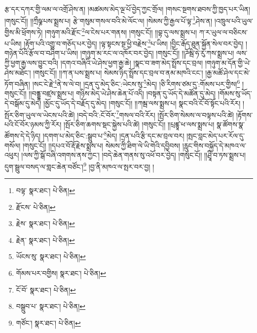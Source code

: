རྩ་དར་དཀར་གྱི་ལམ་ལ་འགྲོ་ཤེས་ན། །མཚམས་མེད་ལྔ་པོ་བྱེད་ཀྱང་གྲོལ། །གསང་སྔགས་ཐབས་ཀྱི་ཁྱད་པར་ཡིན། །གསུང་ངོ།། །།ཀྲྀཥྞ་པས་སྨྲས་པ། རྩེ་གསུམ་གསལ་བའི་མེ་ལོང་ལ། །སེམས་ཀྱི་རྒྱལ་པོ་ལྟ་\footnote{བལྟ་  སྣར་ཐང་།  པེ་ཅིན། }ཤེས་ན། །འཁྲུལ་པའི་ཡུལ་གྱིས་མི་ཕྲོགས་ཏེ། །གཉུག་མའི་རྫོང་\footnote{རྫོངས་  པེ་ཅིན། }ལ་ངེས་པར་གནས། །གསུང་ངོ།། །།བྷ་དུ་ལས་སྨྲས་པ། ཀ་ར་ཡུལ་ལ་བཅིངས་པ་ཡིས། །རྟོག་པའི་འགྱུ་བ་གཅོད་པར་བྱེད། །ལྟ་སྟངས་སྔ་ཕྱི་བརྗེས་\footnote{རྗེས་  སྣར་ཐང་།  པེ་ཅིན། }པ་ཡིས། །བྱིང་རྒོད་ཐུན་སྐྱོན་སེལ་བར་བྱེད། །གཉེན་པོའི་རྩོལ་བ་བཤིག་པ་ཡིས། །གཉུག་མ་རང་ལ་འཁོར་བར་བྱེད། །གསུང་ངོ།། །།ཌོམྦི་ཧེ་རུ་ཀས་སྨྲས་པ། ལས་ཀྱི་ཕྱག་རྒྱ་ལས་བྱུང་བའི། །དགའ་བཞིའི་ཡེ་ཤེས་ཕྱག་རྒྱ་ཆེ། །སྣང་བ་ཟག་མེད་སྤྲོས་དང་བྲལ། །གཉུག་མ་དོན་གྱི་ཡེ་ཤེས་མཐོང་། །གསུང་ངོ།། །།ཀ་ན་པས་སྨྲས་པ། སེམས་ཉིད་སྤྲོས་དང་བྲལ་བ་ནམ་མཁའི་ངང་། །རྒྱ་མཚོ་ཤེལ་དང་མེ་ཏོག་བཞིན། །སང་ངེ་རྗེ་\footnote{རྗེན་  སྣར་ཐང་།  པེ་ཅིན། }ནེ་ས་ལེ་བ། །དྲན་དུ་མེད་ཅིང་:ཡེངས་སུ་\footnote{ཡོངས་སུ་  སྣར་ཐང་།  པེ་ཅིན། }མེད། །ཅི་རིགས་ཙམ་དུ་:གོམས་པར་གྱིས།\footnote{གོམས་པར་བགྱིས།  སྣར་ཐང་།  པེ་ཅིན། } །གསུང་ངོ།། །།བནྡྷ་བཛྲས་སྨྲས་པ། གཉིས་མེད་ཡེ་ཤེས་ཆེན་པོ་འདི། །བསྟན་དུ་ཡོད་དེ་མཚོན་དུ་མེད། །གོམས་སུ་ཡོད་དེ་བསྒོམ་དུ་མེད། །མྱོང་དུ་ཡོད་དེ་བརྗོད་དུ་མེད། །གསུང་ངོ།། །།ཀམྦ་ལས་སྨྲས་པ། སྣང་བའི་ངོ་བོ་སྟོང་པའི་རོར། །སྤོར་ཅིག་ཡུལ་ལ་ཡེངས་པའི་ཚེ། །བདེ་བའི་:ངོ་བོར་\footnote{ངོ་བོ་  སྣར་ཐང་།  པེ་ཅིན། }གསལ་བའི་རོར། །སྤོར་ཅིག་སེམས་ལ་བལྟས་པའི་ཚེ། །རྟོགས་པའི་ངོ་བོར་ཉམས་ཀྱི་རོར། །སྤོར་ཅིག་ཆགས་སྡང་སྐྱེས་པའི་ཚེ། །གསུང་ངོ།། །།པྲཛྙཱ་ཕ་ལས་སྨྲས་པ། སྣ་ཚོགས་སྣ་ཚོགས་དེ་དེ་ཉིད། །དགག་པ་མེད་ཅིང་:སྒྲུབ་པ་\footnote{བསྒྲུབ་པ་  སྣར་ཐང་།  པེ་ཅིན། }མེད། །དྲན་པའི་རྩི་དང་མ་བྲལ་བར། །སྤང་བླང་མེད་པར་རོལ་དུ་གསོལ། །གསུང་ངོ།། །།དཔའ་བོ་རྡོ་རྗེས་སྨྲས་པ། སེམས་ཀྱི་ཐིག་ལེ་ཡི་གེའི་དབྱིབས། །རླུང་གིས་བསྐྱོད་དེ་མཁའ་ལ་འཕུར། །ལས་ཀྱི་སྒོ་བཞི་འགགས་ནས་ཀྱང་། །བདེ་ཆེན་གནས་སུ་འཕོ་བར་བྱེད། །གསུང་ངོ།། །།ཤྲཱི་བ་ཏས་སྨྲས་པ། དུག་སྦྲུལ་བསད་ལ་གླང་ཆེན་བཙོང་།\footnote{གཙོང་།  སྣར་ཐང་།  པེ་ཅིན། } །བྱ་ནི་མཁའ་ལ་སྤར་བར་བྱ། །
